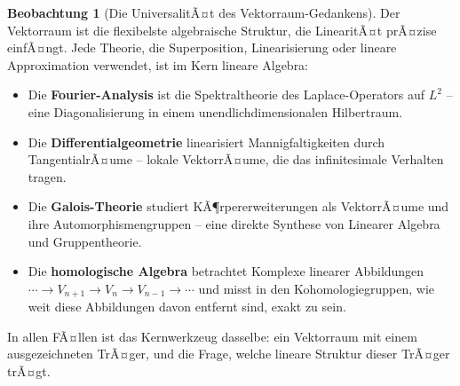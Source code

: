﻿\documentclass[a4paper,12pt]{report}
\theoremstyle{definition}
\newtheorem{beobachtung}{Beobachtung}
\begin{document}
\begin{beobachtung}[Die UniversalitÃ¤t des Vektorraum-Gedankens]
    Der Vektorraum ist die flexibelste algebraische Struktur, die
    LinearitÃ¤t prÃ¤zise einfÃ¤ngt. Jede Theorie, die Superposition,
    Linearisierung oder lineare Approximation verwendet, ist im
    Kern lineare Algebra:
    \begin{itemize}
        \item[-] Die \textbf{Fourier-Analysis} ist die
              Spektraltheorie des Laplace-Operators auf $L^2$ --
              eine Diagonalisierung in einem unendlichdimensionalen
              Hilbertraum.
        \item[-] Die \textbf{Differentialgeometrie} linearisiert
              Mannigfaltigkeiten durch TangentialrÃ¤ume -- lokale
              VektorrÃ¤ume, die das infinitesimale Verhalten tragen.
        \item[-] Die \textbf{Galois-Theorie} studiert KÃ¶rpererweiterungen
              als VektorrÃ¤ume und ihre Automorphismengruppen -- eine
              direkte Synthese von Linearer Algebra und Gruppentheorie.
        \item[-] Die \textbf{homologische Algebra} betrachtet Komplexe
              linearer Abbildungen $\cdots \to V_{n+1} \to V_n \to
              V_{n-1} \to \cdots$ und misst in den Kohomologiegruppen,
              wie weit diese Abbildungen davon entfernt sind, exakt
              zu sein.
    \end{itemize}
    In allen FÃ¤llen ist das Kernwerkzeug dasselbe: ein Vektorraum
    mit einem ausgezeichneten TrÃ¤ger, und die Frage, welche
    lineare Struktur dieser TrÃ¤ger trÃ¤gt.
\end{beobachtung}
\end{document}
